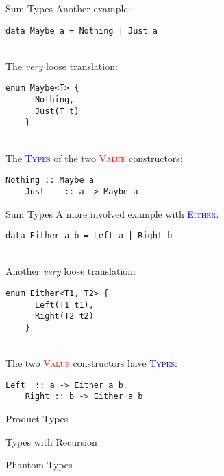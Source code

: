 \documentclass[xcolor={usenames,dvipsnames}]{beamer}
\newcommand{\htycon}[1]{\textcolor{Blue}{\textsc{#1}}}
\newcommand{\hvalcon}[1]{\textcolor{Red}{\textsc{#1}}}
\begin{document}
\begin{frame}[fragile]{Sum Types}
  Another example:
  \begin{lstlisting}[style=hask]
    data Maybe a = Nothing | Just a
  \end{lstlisting}

  \pause
  \ \\
  The \textit{very} loose translation:
  \begin{lstlisting}[style=hask]
    enum Maybe<T> {
      Nothing,
      Just(T t)
    }
  \end{lstlisting}

  \pause
  \ \\
  The \htycon{Types} of the two \hvalcon{Value} constructors:
  \begin{lstlisting}[style=hask]
    Nothing :: Maybe a
    Just    :: a -> Maybe a
  \end{lstlisting}
\end{frame}

\begin{frame}[fragile]{Sum Types}
  A more involved example with \htycon{Either}:
  \begin{lstlisting}[style=hask]
    data Either a b = Left a | Right b
  \end{lstlisting}

  \pause
  \ \\
  Another \textit{very} loose translation:
  \begin{lstlisting}[style=hask]
    enum Either<T1, T2> {
      Left(T1 t1),
      Right(T2 t2)
    }
  \end{lstlisting}

  \pause
  \ \\
  The two \hvalcon{Value} constructors have \htycon{Types}:
  \begin{lstlisting}[style=hask]
    Left  :: a -> Either a b
    Right :: b -> Either a b
  \end{lstlisting}
\end{frame}

\begin{frame}[fragile]{Product Types}
\end{frame}

\begin{frame}[fragile]{Types with Recursion}
\end{frame}

\begin{frame}[fragile]{Phantom Types}
\end{frame}
\end{document}
